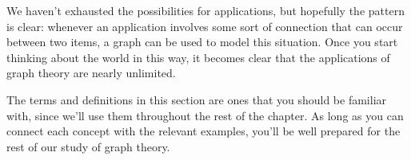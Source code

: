 We haven't exhausted the possibilities for applications, but hopefully the pattern is clear: whenever an application involves some sort of connection that can occur between two items, a graph can be used to model this situation.  Once you start thinking about the world in this way, it becomes clear that the applications of graph theory are nearly unlimited.

The terms and definitions in this section are ones that you should be familiar with, since we'll use them throughout the rest of the chapter.  As long as you can connect each concept with the relevant examples, you'll be well prepared for the rest of our study of graph theory.


